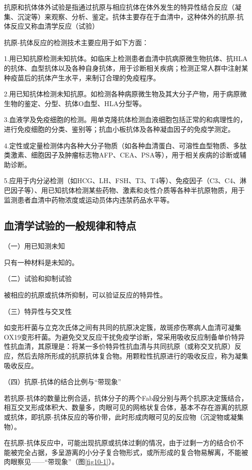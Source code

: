 抗原和抗体体外试验是指通过抗原与相应抗体在体外发生的特异性结合反应（凝集、沉淀等）来观察、分析、鉴定。抗体主要存在于血清中，这种体外的抗原-抗体反应又称血清学反应（试验）

抗原-抗体反应的检测技术主要应用于如下方面：

1.用已知抗原检测未知抗体。如临床上检测患者血清中抗病原微生物抗体、抗HLA的抗体、血型抗体以及各种自身抗体，用于诊断相关疾病；检测正常人群中注射某种疫苗后的抗体产生水平，来制订合理的免疫程序。

2.用已知抗体检测未知抗原。如检测各种病原微生物及其大分子产物，用于病原微生物的鉴定、分型、抗体O血型、HLA分型等。

3.血液学及免疫细胞的检测。用单克隆抗体检测血液细胞包括正常的和病理性的，进行免疫细胞的分类、鉴别等；抗血小板抗体及各种凝血因子的免疫学测定。

4.定性或定量检测体内各种大分子物质（如各种血清蛋白、可溶性血型物质、多肽类激素、细胞因子及肿瘤标志物AFP、CEA、PSA等），用于相关疾病的诊断或辅助诊断。

5.应用于内分泌检测（如HCG、LH、FSH、T3、T4等）、免疫因子（C3、C4、淋巴因子等）、用已知抗体检测某些药物、激素和炎性介质等各种半抗原物质，用于监测患者血清中药物浓度或运动员体内违禁药品水平等。


\subsection{血清学试验的一般规律和特点}

（一）用已知测未知

只有一种材料是未知的。

（二）试验和抑制试验

被相应的抗原或抗体所抑制，可以验证反应的特异性。

（三）特异性与交叉性

如变形杆菌与立克次氏体之间有共同的抗原决定簇，故斑疹伤寒病人血清可凝集OX19变形杆菌。为避免交叉反应干扰免疫学诊断，常采用吸收反应制备单价特异性抗血清，其原理是：将某一多价特异性抗血清与共同抗原（或称交叉抗原）反应，然后去除所形成的抗原抗体复合物。用颗粒性抗原进行的吸收反应，称为凝集吸收反应。

（四）抗原-抗体的结合比例与“带现象”

若抗原-抗体的数量比例合适，抗体分子的两个Fab段分别与两个抗原决定簇结合，相互交叉形成体积大、数量多，肉眼可见的网格状复合体，基本不存在游离的抗原或抗体，即抗原-抗体反应的等价带，此时形成肉眼可见的反应物（沉淀物或凝集物）。

在抗原-抗体反应中，可能出现抗原或抗体过剩的情况，由于过剩一方的结合价不能被完全占据，多呈游离的小分子复合物形式，或所形成的复合物易解离，不能被肉眼察见------“带现象”（图\ref{fig10-1}）。

